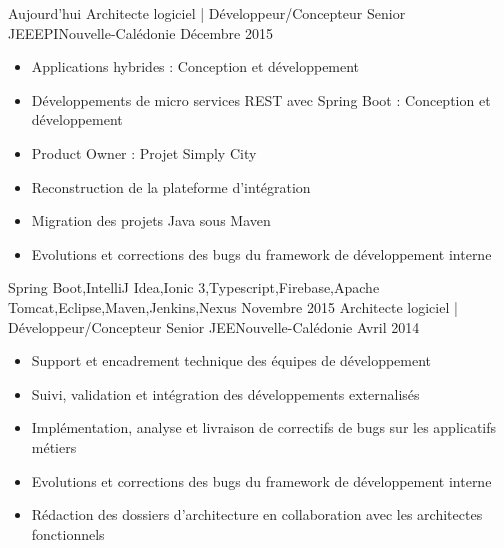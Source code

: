 %
%
%

\begin{experiences}
  \experience
    {Aujourd'hui}   {Architecte logiciel | Développeur/Concepteur Senior JEE}{EPI}{Nouvelle-Calédonie}
    {Décembre 2015} {
                      \begin{itemize}
                        \item Applications hybrides : Conception et développement
                        \item Développements de micro services REST avec Spring Boot : Conception et développement
                        \item Product Owner : Projet Simply City
                        \item Reconstruction de la plateforme d'intégration
                        \item Migration des projets Java sous Maven
                        \item Evolutions et corrections des bugs du framework de développement interne  
                      \end{itemize}
                    }
                    {Spring Boot,IntelliJ Idea,Ionic 3,Typescript,Firebase,Apache Tomcat,Eclipse,Maven,Jenkins,Nexus}
  \emptySeparator
  \experience
    {Novembre 2015} {Architecte logiciel | Développeur/Concepteur Senior JEE}{}{Nouvelle-Calédonie}
    {Avril 2014}    {
                      \begin{itemize}
                        \item Support et encadrement technique des équipes de développement                           
                        \item Suivi, validation et intégration des développements externalisés                        
                        \item Implémentation, analyse et livraison de correctifs de bugs sur les applicatifs métiers  
                        \item Evolutions et corrections des bugs du framework de développement interne                
                        \item Rédaction des dossiers d'architecture en collaboration avec les architectes fonctionnels

\end{itemize}}
\end{experiences}

